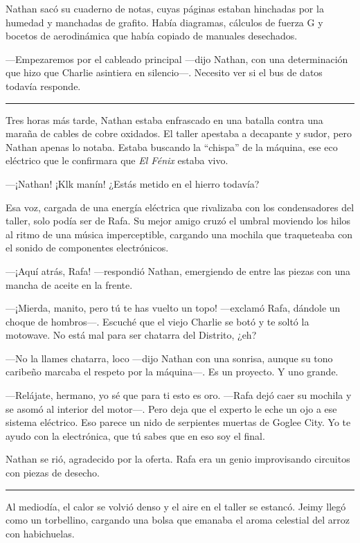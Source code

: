 \documentclass[12pt,a4paper]{book}
\begin{document}
Nathan sacó su cuaderno de notas, cuyas páginas estaban hinchadas por la humedad y manchadas de grafito. Había diagramas, cálculos de fuerza G y bocetos de aerodinámica que había copiado de manuales desechados.

---Empezaremos por el cableado principal ---dijo Nathan, con una determinación que hizo que Charlie asintiera en silencio---. Necesito ver si el bus de datos todavía responde.

\bigskip
\noindent\rule{\textwidth}{0.4pt}
\bigskip

Tres horas más tarde, Nathan estaba enfrascado en una batalla contra una maraña de cables de cobre oxidados. El taller apestaba a decapante y sudor, pero Nathan apenas lo notaba. Estaba buscando la ``chispa'' de la máquina, ese eco eléctrico que le confirmara que \textit{El Fénix} estaba vivo.

---¡Nathan! ¡Klk manín! ¿Estás metido en el hierro todavía?

Esa voz, cargada de una energía eléctrica que rivalizaba con los condensadores del taller, solo podía ser de Rafa. Su mejor amigo cruzó el umbral moviendo los hilos al ritmo de una música imperceptible, cargando una mochila que traqueteaba con el sonido de componentes electrónicos.

---¡Aquí atrás, Rafa! ---respondió Nathan, emergiendo de entre las piezas con una mancha de aceite en la frente.

---¡Mierda, manito, pero tú te has vuelto un topo! ---exclamó Rafa, dándole un choque de hombros---. Escuché que el viejo Charlie se botó y te soltó la motowave. No está mal para ser chatarra del Distrito, ¿eh?

---No la llames chatarra, loco ---dijo Nathan con una sonrisa, aunque su tono caribeño marcaba el respeto por la máquina---. Es un proyecto. Y uno grande.

---Relájate, hermano, yo sé que para ti esto es oro. ---Rafa dejó caer su mochila y se asomó al interior del motor---. Pero deja que el experto le eche un ojo a ese sistema eléctrico. Eso parece un nido de serpientes muertas de Goglee City. Yo te ayudo con la electrónica, que tú sabes que en eso soy el final.

Nathan se rió, agradecido por la oferta. Rafa era un genio improvisando circuitos con piezas de desecho.

\bigskip
\noindent\rule{\textwidth}{0.4pt}
\bigskip

Al mediodía, el calor se volvió denso y el aire en el taller se estancó. Jeimy llegó como un torbellino, cargando una bolsa que emanaba el aroma celestial del arroz con habichuelas.
\end{document}
